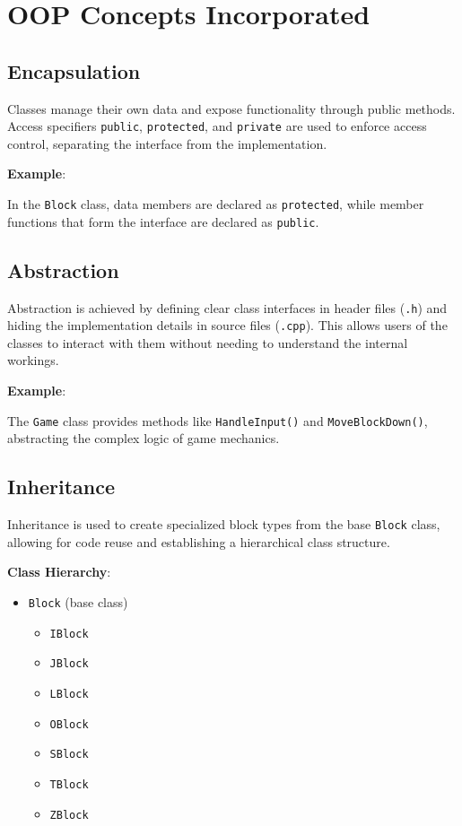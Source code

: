 \documentclass{article}
\begin{document}
\section{OOP Concepts Incorporated}

\subsection{Encapsulation}

Classes manage their own data and expose functionality through public methods. Access specifiers \texttt{public}, \texttt{protected}, and \texttt{private} are used to enforce access control, separating the interface from the implementation.

\textbf{Example}:

In the \texttt{Block} class, data members are declared as \texttt{protected}, while member functions that form the interface are declared as \texttt{public}.

\subsection{Abstraction}

Abstraction is achieved by defining clear class interfaces in header files (\texttt{.h}) and hiding the implementation details in source files (\texttt{.cpp}). This allows users of the classes to interact with them without needing to understand the internal workings.

\textbf{Example}:

The \texttt{Game} class provides methods like \texttt{HandleInput()} and \texttt{MoveBlockDown()}, abstracting the complex logic of game mechanics.

\subsection{Inheritance}

Inheritance is used to create specialized block types from the base \texttt{Block} class, allowing for code reuse and establishing a hierarchical class structure.

\textbf{Class Hierarchy}:

\begin{itemize}
    \item \texttt{Block} (base class)
    \begin{itemize}
        \item \texttt{IBlock}
        \item \texttt{JBlock}
        \item \texttt{LBlock}
        \item \texttt{OBlock}
        \item \texttt{SBlock}
        \item \texttt{TBlock}
        \item \texttt{ZBlock}
    \end{itemize}
\end{itemize}
\end{document}
